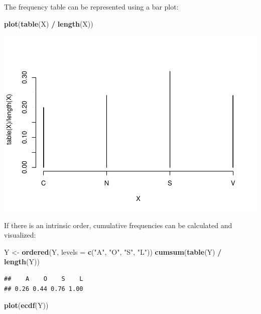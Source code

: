 \documentclass[
]{article}
\newenvironment{Shaded}{\begin{snugshade}}{\end{snugshade}}
\newcommand{\AttributeTok}[1]{\textcolor[rgb]{0.13,0.29,0.53}{#1}}
\newcommand{\FunctionTok}[1]{\textcolor[rgb]{0.13,0.29,0.53}{\textbf{#1}}}
\newcommand{\NormalTok}[1]{#1}
\newcommand{\OtherTok}[1]{\textcolor[rgb]{0.56,0.35,0.01}{#1}}
\newcommand{\SpecialCharTok}[1]{\textcolor[rgb]{0.81,0.36,0.00}{\textbf{#1}}}
\newcommand{\StringTok}[1]{\textcolor[rgb]{0.31,0.60,0.02}{#1}}
\begin{document}
The frequency table can be represented using a bar plot:

\begin{Shaded}
\begin{Highlighting}[]
\FunctionTok{plot}\NormalTok{(}\FunctionTok{table}\NormalTok{(X) }\SpecialCharTok{/} \FunctionTok{length}\NormalTok{(X))}
\end{Highlighting}
\end{Shaded}

\includegraphics{EDA_files/figure-latex/unnamed-chunk-7-1.pdf}

If there is an intrinsic order, cumulative frequencies can be calculated
and visualized:

\begin{Shaded}
\begin{Highlighting}[]
\NormalTok{Y }\OtherTok{\textless{}{-}} \FunctionTok{ordered}\NormalTok{(Y, }\AttributeTok{levels =} \FunctionTok{c}\NormalTok{(}\StringTok{"A"}\NormalTok{, }\StringTok{"O"}\NormalTok{, }\StringTok{"S"}\NormalTok{, }\StringTok{"L"}\NormalTok{))}
\FunctionTok{cumsum}\NormalTok{(}\FunctionTok{table}\NormalTok{(Y) }\SpecialCharTok{/} \FunctionTok{length}\NormalTok{(Y))}
\end{Highlighting}
\end{Shaded}

\begin{verbatim}
##    A    O    S    L 
## 0.26 0.44 0.76 1.00
\end{verbatim}

\begin{Shaded}
\begin{Highlighting}[]
\FunctionTok{plot}\NormalTok{(}\FunctionTok{ecdf}\NormalTok{(Y))}
\end{Highlighting}
\end{Shaded}
\end{document}
